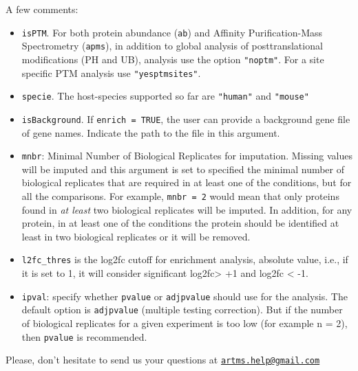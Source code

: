 \documentclass[]{article}
\providecommand{\tightlist}{%
  \setlength{\itemsep}{0pt}\setlength{\parskip}{0pt}}
\begin{document}
A few comments:

\begin{itemize}
\tightlist
\item
  \texttt{isPTM}. For both protein abundance (\texttt{ab}) and Affinity
  Purification-Mass Spectrometry (\texttt{apms}), in addition to global
  analysis of posttranslational modifications (PH and UB), analysis use
  the option \texttt{"noptm"}. For a site specific PTM analysis use
  \texttt{"yesptmsites"}.
\item
  \texttt{specie}. The host-species supported so far are
  \texttt{"human"} and \texttt{"mouse"}
\item
  \texttt{isBackground}. If \texttt{enrich\ =\ TRUE}, the user can
  provide a background gene file of gene names. Indicate the path to the
  file in this argument.
\item
  \texttt{mnbr}: Minimal Number of Biological Replicates for imputation.
  Missing values will be imputed and this argument is set to specified
  the minimal number of biological replicates that are required in at
  least one of the conditions, but for all the comparisons. For example,
  \texttt{mnbr\ =\ 2} would mean that only proteins found in \emph{at
  least} two biological replicates will be imputed. In addition, for any
  protein, in at least one of the conditions the protein should be
  identified at least in two biological replicates or it will be
  removed.
\item
  \texttt{l2fc\_thres} is the log2fc cutoff for enrichment analysis,
  absolute value, i.e., if it is set to 1, it will consider significant
  log2fc\textgreater{} +1 and log2fc \textless{} -1.
\item
  \texttt{ipval}: specify whether \texttt{pvalue} or \texttt{adjpvalue}
  should use for the analysis. The default option is \texttt{adjpvalue}
  (multiple testing correction). But if the number of biological
  replicates for a given experiment is too low (for example n = 2), then
  \texttt{pvalue} is recommended.
\end{itemize}

Please, don't hesitate to send us your questions at
\href{mailto:artms.help@gmail.com}{\nolinkurl{artms.help@gmail.com}}
\end{document}
